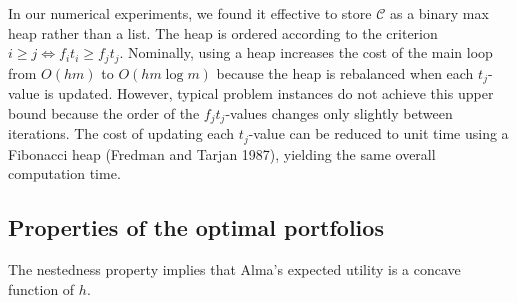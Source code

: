 \documentclass[12pt]{article} %
\newtheorem{proposition}{Proposition}
\theoremstyle{definition}
\newtheorem{proposition}{제의}
\theoremstyle{definition}
\begin{document}
In our numerical experiments, we found it effective to store $\mathcal{C}$ as a binary max heap rather than a list. The heap is ordered according to the criterion $i \geq j \iff f_i t_i \geq f_j t_j$. Nominally, using a heap increases the cost of the main loop from $O(h m)$ to $O(hm \log m)$ because the heap is rebalanced when each $t_j$-value is updated. However, typical problem instances do not achieve this upper bound because the order of the $f_j t_j$-values changes only slightly between iterations. The cost of updating each $t_j$-value can be reduced to unit time using a Fibonacci heap (Fredman and Tarjan 1987), yielding the same overall computation time. 


\subsection{Properties of the optimal portfolios}
The nestedness property implies that Alma's expected utility is a concave function of $h$.
\end{document}
